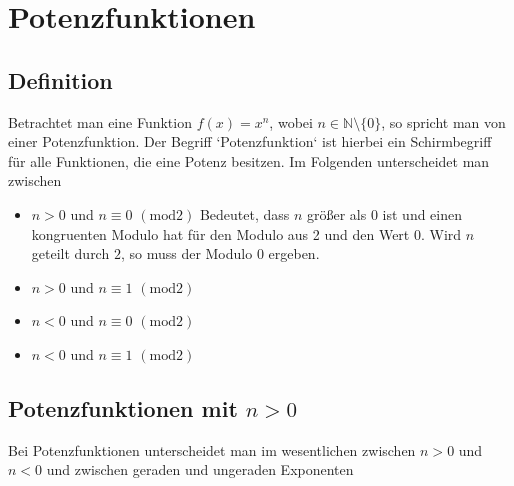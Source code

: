 \section{Potenzfunktionen}\label{sec:Potenzfunktionen}
\subsection{Definition}\label{sec:Potenzfunktionen/Definition}
Betrachtet man eine Funktion $f(x)=x^n$, wobei $n\in\mathbb{N}\setminus\{0\}$, so spricht man von einer Potenzfunktion. Der Begriff `{}Potenzfunktion`{} ist hierbei ein Schirmbegriff für alle Funktionen, die eine Potenz besitzen. Im Folgenden unterscheidet man zwischen
\begin{itemize}
	\item $n>0$ und $ n\equiv0$ $(\mathrm{mod}2)$ Bedeutet, dass $n$ größer als 0 ist und einen kongruenten Modulo hat für den Modulo aus 2 und den Wert $0$. Wird $n$ geteilt durch $2$, so muss der Modulo $0$ ergeben.
	\item $n>0$ und $ n\equiv1$ $(\mathrm{mod}2)$
	\item $n<0$ und $ n\equiv0 $ $(\mathrm{mod}2)$
	\item $n<0$ und $ n\equiv1$ $(\mathrm{mod}2)$
\end{itemize}
\subsection{Potenzfunktionen mit $n>0$}\label{sec:Potenzfunktionen/Potenzfunktionen mit positivem Exponenten}
Bei Potenzfunktionen unterscheidet man im wesentlichen zwischen $n>0$ und $n<0$ und zwischen geraden und ungeraden Exponenten
